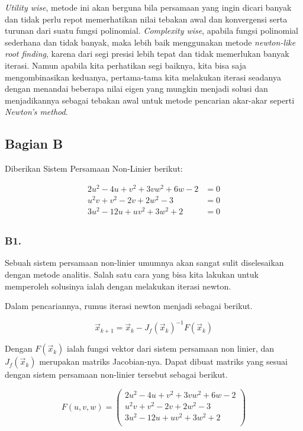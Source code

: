 \documentclass[11pt, a4paper, onecolumn, oneside, final]{report}
\begin{document}
\textit{Utility wise}, metode ini akan berguna bila persamaan yang ingin dicari banyak dan tidak perlu repot memerhatikan nilai tebakan awal dan konvergensi serta turunan dari suatu fungsi polinomial. \textit{Complexity wise}, apabila fungsi polinomial sederhana dan tidak banyak, maka lebih baik menggunakan metode \textit{newton-like root finding}, karena dari segi presisi lebih tepat dan tidak memerlukan banyak iterasi. Namun apabila kita perhatikan segi baiknya, kita bisa saja mengombinasikan keduanya, pertama-tama kita melakukan iterasi seadanya dengan menandai beberapa nilai eigen yang mungkin menjadi solusi dan menjadikannya sebagai tebakan awal untuk metode pencarian akar-akar seperti \textit{Newton's method}.

\subsection*{Bagian B}

Diberikan Sistem Persamaan Non-Linier berikut:

$$
\begin{aligned}
2u^2 - 4u +v^2 + 3vw^2 + 6w - 2 &= 0\\
u^2v + v^2 - 2v + 2w^2 - 3 &= 0\\
3u^2 - 12u + uv^2 + 3w^2 + 2 &= 0\\
\end{aligned}
$$

\subsubsection*{B1.}

Sebuah sistem persamaan non-linier umumnya akan sangat sulit diselesaikan dengan metode analitis. Salah satu cara yang bisa kita lakukan untuk memperoleh solusinya ialah dengan melakukan iterasi newton. 

Dalam pencariannya, rumus iterasi newton menjadi sebagai berikut.

$$
\vec{x}_{k+1} = \vec{x}_k - J_f(\vec{x}_k)^{-1} F(\vec{x}_k)
$$

Dengan $F(\vec{x}_k)$ ialah fungsi vektor dari sistem persamaan non linier, dan $J_f(\vec{x}_k)$ merupakan matriks Jacobian-nya. Dapat dibuat matriks yang sesuai dengan sistem persamaan non-linier tersebut sebagai berikut.

$$
F(u,v,w) = 
\left(
\begin{array}{ccc}
2u^2 - 4u + v^2 + 3vw^2 + 6w - 2\\
u^2v + v^2 - 2v + 2w^2 - 3\\
3u^2 - 12u + uv^2 + 3w^2 + 2\\
\end{array}
\right)
$$
\end{document}
